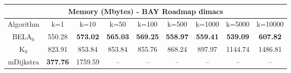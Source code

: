\begin{tabular}{c|cccccccc}\toprule
\multicolumn{9}{c}{Memory (Mbytes) - BAY Roadmap dimacs}\\ \midrule
Algorithm & k=1 & k=10 & k=50 & k=100 & k=500 & k=1000 & k=5000 & k=10000 \\ \midrule
BELA$_0$ & 550.28 & \textbf{573.02} & \textbf{565.03} & \textbf{569.25} & \textbf{558.97} & \textbf{559.41} & \textbf{539.09} & \textbf{607.82} \\
K$_0$ & 823.91 & 853.84 & 853.84 & 855.76 & 868.24 & 897.97 & 1144.74 & 1486.81 \\
mDijkstra & \textbf{377.76} & 1759.59 & -- & -- & -- & -- & -- & -- \\ \bottomrule 
\end{tabular}
